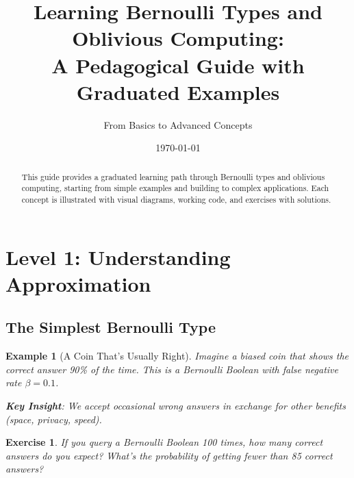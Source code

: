 \documentclass[11pt]{article}
\title{Learning Bernoulli Types and Oblivious Computing:\\A Pedagogical Guide with Graduated Examples}
\author{From Basics to Advanced Concepts}
\date{\today}
\newtheorem{example}{Example}[section]
\newtheorem{exercise}{Exercise}[section]
\begin{document}
\maketitle

\begin{abstract}
This guide provides a graduated learning path through Bernoulli types and oblivious computing, starting from simple examples and building to complex applications. Each concept is illustrated with visual diagrams, working code, and exercises with solutions.
\end{abstract}

\section{Level 1: Understanding Approximation}

\subsection{The Simplest Bernoulli Type}

\begin{example}[A Coin That's Usually Right]
Imagine a biased coin that shows the correct answer 90\% of the time. This is a Bernoulli Boolean with false negative rate $\beta = 0.1$.

\begin{center}
\end{center}

\textbf{Key Insight}: We accept occasional wrong answers in exchange for other benefits (space, privacy, speed).
\end{example}

\begin{exercise}
If you query a Bernoulli Boolean 100 times, how many correct answers do you expect? What's the probability of getting fewer than 85 correct answers?
\end{exercise}
\end{document}
